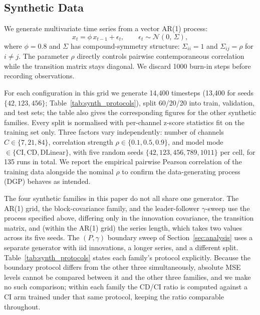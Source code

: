 \documentclass[10pt]{article} %
\begin{document}
    \subsection{Synthetic Data}

    We generate multivariate time series from a vector AR(1) process:
    \begin{equation}
        x_{t} = \phi\, x_{t-1} + \epsilon_{t}, \qquad \epsilon_{t} \sim \mathcal{N}(0,\,\Sigma),
    \end{equation}
    where $\phi = 0.8$ and $\Sigma$ has compound-symmetry structure: $\Sigma_{ii} = 1$ and $\Sigma_{ij} = \rho$ for
    $i \neq j$. The parameter $\rho$ directly controls pairwise contemporaneous correlation while the transition matrix
    stays diagonal. We discard 1000 burn-in steps before recording observations.

    For each configuration in this grid we generate 14,400 timesteps (13,400 for seeds $\{42, 123, 456\}$;
    Table~\ref{tab:synth_protocols}), split 60/20/20 into train, validation, and test sets; the table also gives the corresponding
    figures for the other synthetic families. Every split is normalised with per-channel z-score statistics fit on the training
    set only. Three factors vary independently: number of channels $C \in \{7, 21, 84\}$, correlation strength
    $\rho \in \{0.1, 0.5, 0.9\}$, and model mode $\in \{\text{CI}, \text{CD}, \text{DLinear}\}$, with five random seeds
    $\{42, 123, 456, 789, 1011\}$ per cell, for 135 runs in total. We report the empirical pairwise Pearson correlation of the
    training data alongside the nominal $\rho$ to confirm the data-generating process (DGP) behaves as intended.

    The four synthetic families in this paper do not all share one generator. The AR(1) grid, the block-covariance family, and
    the leader-follower $\gamma$-sweep use the process specified above, differing only in the innovation covariance, the
    transition matrix, and (within the AR(1) grid) the series length, which takes two values across its five seeds. The
    $(P, \gamma)$ boundary sweep of Section~\ref{sec:analysis} uses a separate generator with iid innovations, a longer series,
    and a different split. Table~\ref{tab:synth_protocols} states each family's protocol explicitly. Because the boundary
    protocol differs from the other three simultaneously, absolute MSE levels cannot be compared between it and the other three
    families, and we make no such comparison; within each family the CD/CI ratio is computed against a CI arm trained under
    that same protocol, keeping the ratio comparable throughout.
\end{document}
